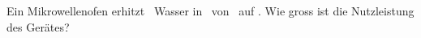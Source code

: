 Ein Mikrowellenofen erhitzt \VWaO\ Wasser in \tMiO\ von \TaO\ auf \TbO. Wie gross ist die Nutzleistung des Gerätes?
